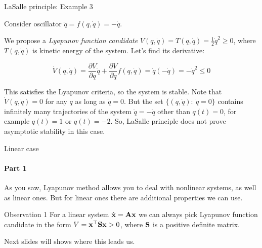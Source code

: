 \documentclass{beamer}
\begin{document}
\begin{frame}{LaSalle principle: Example 3}
	\begin{flushleft}
		
		Consider oscillator $\ddot{q} = f(q, \dot{q}) = -\dot{q}$. 
		
		\bigskip
		
		We propose a \emph{Lyapunov function candidate} $V(q, \dot{q}) = T(q, \dot{q}) = \frac{1}{2} \dot{q}^2 \geq 0$, where $T(q, \dot{q})$ is kinetic energy of the system. Let's find its derivative:
		
		\begin{equation}
			\dot V(q, \dot{q}) = 
			\frac{\partial V}{\partial q}       \dot{q} +
			\frac{\partial V}{\partial \dot{q}} f(q, \dot{q}) = 
			\dot{q} (-\dot{q}) = -\dot{q}^2 \leq 0
		\end{equation}
		
		
		This satisfies the Lyapunov criteria, so the system is stable. Note that $\dot V(q, \dot{q}) = 0$ for any $q$ as long as $\dot{q} = 0$. But the set $\{(q, \dot{q}): \   \dot{q} = 0 \}$ contains infinitely many trajectories of the system $\ddot{q} = -\dot{q}$ other than $q(t) = 0$, for example $q(t) = 1$ or $q(t) = -2$. So, LaSalle principle does not prove asymptotic stability in this case.
		
	\end{flushleft}
\end{frame}


%		
%		






\begin{frame}{Linear case}
\framesubtitle{Part 1}
\begin{flushleft}

As you saw, Lyapunov method allows you to deal with nonlinear systems, as well as linear ones. But for linear ones there are additional properties we can use.

\bigskip

\begin{block}{Observation 1}
For a linear system $\dot{\mathbf{x}} = \mathbf{A}\mathbf{x}$ we can always pick Lyapunov function candidate in the form $V = \mathbf{x}^\top\mathbf{S}\mathbf{x} > 0$, where $\mathbf{S}$ is a positive definite matrix.
\end{block}

\bigskip

Next slides will shows where this leads us.

\end{flushleft}
\end{frame}
\end{document}
